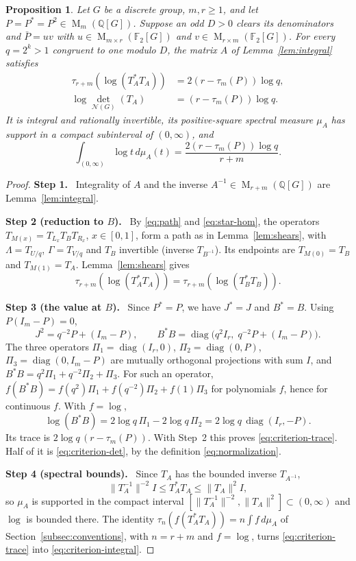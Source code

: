 \documentclass[11pt]{article}
\newtheorem{proposition}[theorem]{Proposition}
\theoremstyle{remark}
\numberwithin{equation}{section}
\newcommand{\F}{\mathbb F}
\newcommand{\Q}{\mathbb Q}
\newcommand{\Mat}{\operatorname{M}}
\newcommand{\diag}{\operatorname{diag}}
\newcommand{\N}{\mathcal N}
\newcommand{\step}[1]{\par\smallskip\noindent\textbf{Step #1.}\ }
\begin{document}
\begin{proposition}\label{prop:criterion}
Let $G$ be a discrete group, $m,r\ge1$, and let
$P=P^*=P^2\in\Mat_m(\Q[G])$. Suppose an odd $D>0$ clears its
denominators and $\bar P=uv$ with
$u\in\Mat_{m\times r}(\F_2[G])$ and
$v\in\Mat_{r\times m}(\F_2[G])$. For every $q=2^k>1$ congruent to one
modulo $D$, the matrix $A$ of Lemma~\ref{lem:integral} satisfies
\begin{align}
 \tau_{r+m}(\log(T_A^*T_A))
   &=2(r-\tau_m(P))\log q,\label{eq:criterion-trace}\\
 \log\det_{\N(G)}(T_A)&=(r-\tau_m(P))\log q.
 \label{eq:criterion-det}
\end{align}
It is integral and rationally invertible, its positive-square
spectral measure $\mu_A$ has support in a compact subinterval of $(0,\infty)$, and
\begin{equation}\label{eq:criterion-integral}
 \int_{(0,\infty)}\log t\,d\mu_A(t)
 =\frac{2(r-\tau_m(P))\log q}{r+m}.
\end{equation}
\end{proposition}

\begin{proof}
\step{1} Integrality of $A$ and the inverse $A^{-1}\in\Mat_{r+m}(\Q[G])$ are Lemma~\ref{lem:integral}.

\step{2 (reduction to $B$)} By \eqref{eq:path} and \eqref{eq:star-hom}, the operators $T_{M(x)}=T_{L_x}T_BT_{R_x}$, $x\in[0,1]$, form a path as in Lemma~\ref{lem:shears}, with $\Lambda=T_{U/q}$, $\Gamma=T_{V/q}$ and $T_B$ invertible (inverse $T_{B^{-1}}$). Its endpoints are $T_{M(0)}=T_B$ and $T_{M(1)}=T_A$. Lemma~\ref{lem:shears} gives
\[
 \tau_{r+m}(\log(T_A^*T_A))=\tau_{r+m}(\log(T_B^*T_B)).
\]

\step{3 (the value at $B$)} Since $P^*=P$, we have $J^*=J$ and $B^*=B$. Using $P(I_m-P)=0$,
\[
 J^2=q^{-2}P+(I_m-P),\qquad B^*B=\diag\bigl(q^2I_r,\;q^{-2}P+(I_m-P)\bigr).
\]
The three operators $\Pi_1=\diag(I_r,0)$, $\Pi_2=\diag(0,P)$, $\Pi_3=\diag(0,I_m-P)$ are mutually orthogonal projections with sum $I$, and $B^*B=q^2\Pi_1+q^{-2}\Pi_2+\Pi_3$. For such an operator, $f(B^*B)=f(q^2)\Pi_1+f(q^{-2})\Pi_2+f(1)\Pi_3$ for polynomials $f$, hence for continuous $f$. With $f=\log$,
\[
 \log(B^*B)=2\log q\,\Pi_1-2\log q\,\Pi_2=2\log q\,\diag(I_r,-P).
\]
Its trace is $2\log q\,(r-\tau_m(P))$. With Step~2 this proves \eqref{eq:criterion-trace}. Half of it is \eqref{eq:criterion-det}, by the definition \eqref{eq:normalization}.

\step{4 (spectral bounds)} Since $T_A$ has the bounded inverse $T_{A^{-1}}$,
\[
 \|T_A^{-1}\|^{-2}I\le T_A^*T_A\le\|T_A\|^2I ,
\]
so $\mu_A$ is supported in the compact interval $[\|T_A^{-1}\|^{-2},\|T_A\|^2]\subset(0,\infty)$ and $\log$ is bounded there. The identity $\tau_n(f(T_A^*T_A))=n\int f\,d\mu_A$ of Section~\ref{subsec:conventions}, with $n=r+m$ and $f=\log$, turns \eqref{eq:criterion-trace} into \eqref{eq:criterion-integral}.
\end{proof}
\end{document}

